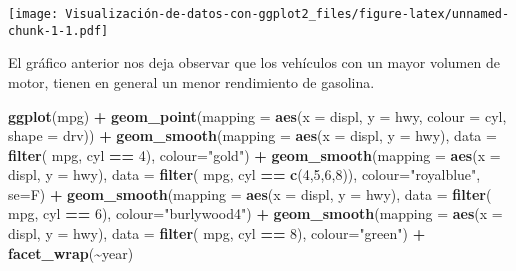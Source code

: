 \documentclass[
]{article}
\newenvironment{Shaded}{\begin{snugshade}}{\end{snugshade}}
\newcommand{\DataTypeTok}[1]{\textcolor[rgb]{0.13,0.29,0.53}{#1}}
\newcommand{\DecValTok}[1]{\textcolor[rgb]{0.00,0.00,0.81}{#1}}
\newcommand{\KeywordTok}[1]{\textcolor[rgb]{0.13,0.29,0.53}{\textbf{#1}}}
\newcommand{\NormalTok}[1]{#1}
\newcommand{\OperatorTok}[1]{\textcolor[rgb]{0.81,0.36,0.00}{\textbf{#1}}}
\newcommand{\StringTok}[1]{\textcolor[rgb]{0.31,0.60,0.02}{#1}}
\begin{document}
\texttt{[image: Visualización-de-datos-con-ggplot2\_files/figure-latex/unnamed-chunk-1-1.pdf]}

El gráfico anterior nos deja observar que los vehículos con un mayor
volumen de motor, tienen en general un menor rendimiento de gasolina.

\begin{Shaded}
\begin{Highlighting}[]
\KeywordTok{ggplot}\NormalTok{(mpg) }\OperatorTok{+}
\StringTok{  }\KeywordTok{geom\_point}\NormalTok{(}\DataTypeTok{mapping =} \KeywordTok{aes}\NormalTok{(}\DataTypeTok{x =}\NormalTok{ displ, }\DataTypeTok{y =}\NormalTok{ hwy, }\DataTypeTok{colour =}\NormalTok{ cyl, }\DataTypeTok{shape =}\NormalTok{ drv)) }\OperatorTok{+}
\StringTok{  }\KeywordTok{geom\_smooth}\NormalTok{(}\DataTypeTok{mapping =} \KeywordTok{aes}\NormalTok{(}\DataTypeTok{x =}\NormalTok{ displ, }\DataTypeTok{y =}\NormalTok{ hwy), }\DataTypeTok{data =} \KeywordTok{filter}\NormalTok{( mpg, cyl }\OperatorTok{==}\StringTok{ }\DecValTok{4}\NormalTok{),}
              \DataTypeTok{colour=}\StringTok{"gold"}\NormalTok{) }\OperatorTok{+}
\StringTok{  }\KeywordTok{geom\_smooth}\NormalTok{(}\DataTypeTok{mapping =} \KeywordTok{aes}\NormalTok{(}\DataTypeTok{x =}\NormalTok{ displ, }\DataTypeTok{y =}\NormalTok{ hwy), }
              \DataTypeTok{data =} \KeywordTok{filter}\NormalTok{( mpg, cyl }\OperatorTok{==}\StringTok{ }\KeywordTok{c}\NormalTok{(}\DecValTok{4}\NormalTok{,}\DecValTok{5}\NormalTok{,}\DecValTok{6}\NormalTok{,}\DecValTok{8}\NormalTok{)),}
              \DataTypeTok{colour=}\StringTok{"royalblue"}\NormalTok{, }\DataTypeTok{se=}\NormalTok{F) }\OperatorTok{+}
\StringTok{  }\KeywordTok{geom\_smooth}\NormalTok{(}\DataTypeTok{mapping =} \KeywordTok{aes}\NormalTok{(}\DataTypeTok{x =}\NormalTok{ displ, }\DataTypeTok{y =}\NormalTok{ hwy),}
              \DataTypeTok{data =} \KeywordTok{filter}\NormalTok{( mpg, cyl }\OperatorTok{==}\StringTok{ }\DecValTok{6}\NormalTok{), }\DataTypeTok{colour=}\StringTok{"burlywood4"}\NormalTok{) }\OperatorTok{+}\StringTok{  }
\StringTok{  }\KeywordTok{geom\_smooth}\NormalTok{(}\DataTypeTok{mapping =} \KeywordTok{aes}\NormalTok{(}\DataTypeTok{x =}\NormalTok{ displ, }\DataTypeTok{y =}\NormalTok{ hwy),}
              \DataTypeTok{data =} \KeywordTok{filter}\NormalTok{( mpg, cyl }\OperatorTok{==}\StringTok{ }\DecValTok{8}\NormalTok{), }\DataTypeTok{colour=}\StringTok{"green"}\NormalTok{) }\OperatorTok{+}
\StringTok{  }\KeywordTok{facet\_wrap}\NormalTok{(}\OperatorTok{\textasciitilde{}}\NormalTok{year)}
\end{Highlighting}
\end{Shaded}
\end{document}

